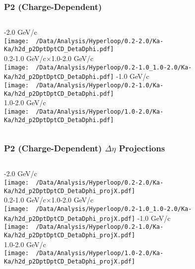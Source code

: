 \documentclass{beamer}
\begin{document}
\begin{frame}
	\frametitle{P2 (Charge-Dependent)}
	\begin{columns}
		-2.0 GeV/c\\
		\texttt{[image: ~/Data/Analysis/Hyperloop/0.2-2.0/Ka-Ka/h2d\_p2DptDptCD\_DetaDphi.pdf]}\\0.2-1.0 GeV/c$\times$1.0-2.0 GeV/c\\
		\texttt{[image: ~/Data/Analysis/Hyperloop/0.2-1.0\_1.0-2.0/Ka-Ka/h2d\_p2DptDptCD\_DetaDphi.pdf]}
		-1.0 GeV/c\\
		\texttt{[image: ~/Data/Analysis/Hyperloop/0.2-1.0/Ka-Ka/h2d\_p2DptDptCD\_DetaDphi.pdf]}\\1.0-2.0 GeV/c\\
		\texttt{[image: ~/Data/Analysis/Hyperloop/1.0-2.0/Ka-Ka/h2d\_p2DptDptCD\_DetaDphi.pdf]}
	\end{columns}
\end{frame}
\begin{frame}
	\frametitle{P2 (Charge-Dependent) $\Delta\eta$ Projections}
	\begin{columns}
		\column{0.5\textwidth}
		-2.0 GeV/c\\
		\texttt{[image: ~/Data/Analysis/Hyperloop/0.2-2.0/Ka-Ka/h2d\_p2DptDptCD\_DetaDphi\_projX.pdf]}\\0.2-1.0 GeV/c$\times$1.0-2.0 GeV/c\\
		\texttt{[image: ~/Data/Analysis/Hyperloop/0.2-1.0\_1.0-2.0/Ka-Ka/h2d\_p2DptDptCD\_DetaDphi\_projX.pdf]}
		\column{0.5\textwidth}
		-1.0 GeV/c\\
		\texttt{[image: ~/Data/Analysis/Hyperloop/0.2-1.0/Ka-Ka/h2d\_p2DptDptCD\_DetaDphi\_projX.pdf]}\\1.0-2.0 GeV/c\\
		\texttt{[image: ~/Data/Analysis/Hyperloop/1.0-2.0/Ka-Ka/h2d\_p2DptDptCD\_DetaDphi\_projX.pdf]}
	\end{columns}
\end{frame}
\end{document}
